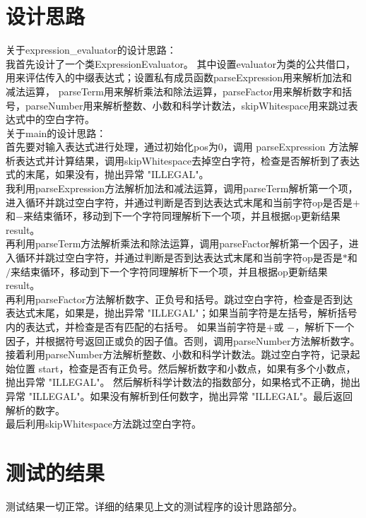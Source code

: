 \documentclass[UTF8]{ctexart}
\begin{document}
\pagestyle{fancy}
\fancyhead{}

\section{设计思路}
\indent 关于expression\_evaluator的设计思路：\\
\indent 我首先设计了一个类ExpressionEvaluator。
其中设置evaluator为类的公共借口，用来评估传入的中缀表达式；设置私有成员函数parseExpression用来解析加法和减法运算，
parseTerm用来解析乘法和除法运算，parseFactor用来解析数字和括号，parseNumber用来解析整数、小数和科学计数法，skipWhitespace用来跳过表达式中的空白字符。\\
\indent 关于main的设计思路：\\
\indent 首先要对输入表达式进行处理，通过初始化pos为0，调用 parseExpression 方法解析表达式并计算结果，调用skipWhitespace去掉空白字符，检查是否解析到了表达式的末尾，如果没有，抛出异常 "ILLEGAL"。\\
我利用parseExpression方法解析加法和减法运算，调用parseTerm解析第一个项，进入循环并跳过空白字符，并通过判断是否到达表达式末尾和当前字符op是否是$+$和$-$来结束循环，移动到下一个字符同理解析下一个项，并且根据op更新结果result。\\
\indent 再利用parseTerm方法解析乘法和除法运算，调用parseFactor解析第一个因子，进入循环并跳过空白字符，并通过判断是否到达表达式末尾和当前字符op是否是$*$和$/$来结束循环，移动到下一个字符同理解析下一个项，并且根据op更新结果result。\\
\indent 再利用parseFactor方法解析数字、正负号和括号。跳过空白字符，检查是否到达表达式末尾，如果是，抛出异常 "ILLEGAL"；如果当前字符是左括号，解析括号内的表达式，并检查是否有匹配的右括号。
如果当前字符是$+$或 $-$，解析下一个因子，并根据符号返回正或负的因子值。否则，调用parseNumber方法解析数字。\\
\indent 接着利用parseNumber方法解析整数、小数和科学计数法。跳过空白字符，记录起始位置 start，检查是否有正负号。然后解析数字和小数点，如果有多个小数点，抛出异常 "ILLEGAL"。
然后解析科学计数法的指数部分，如果格式不正确，抛出异常 "ILLEGAL"。如果没有解析到任何数字，抛出异常 "ILLEGAL"。最后返回解析的数字。\\
最后利用skipWhitespace方法跳过空白字符。\\




\section{测试的结果}

测试结果一切正常。详细的结果见上文的测试程序的设计思路部分。
\end{document}
